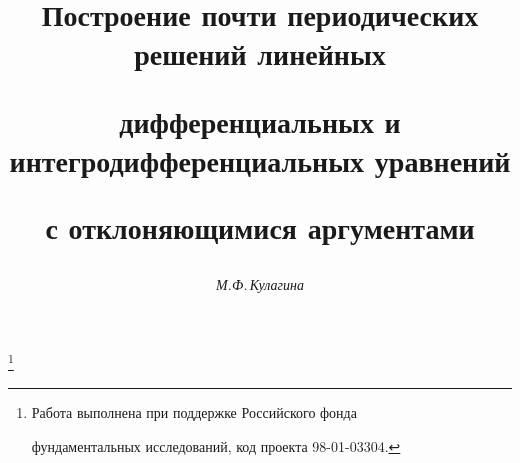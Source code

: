 

 


% 


\newcommand{\tts}[1]{}


 




\setcounter{page}{33} 












 


\author{\it М.Ф.\,Кулагина} 




\title{Построение почти периодических решений линейных 


дифференциальных и интегродифференциальных уравнений 


с отклоняющимися аргументами} 


\thanks{Работа выполнена при поддержке Российского фонда 


фундаментальных исследований, код проекта 98-01-03304.} 


 


\date{} 




\pagestyle{plain} %


 




\maketitle 


